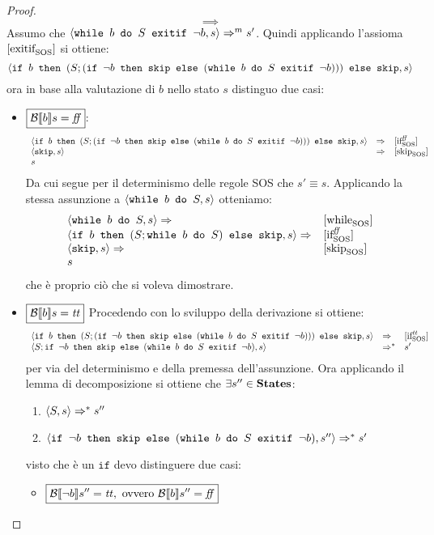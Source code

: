 \begin{enumerate}
\begin{proof}
$$
\boxed{\implies}
$$
Assumo che $\confSs{\wbSE{b}{S}{\neg b}}{s} \Rar{m} s'$.
Quindi applicando l'assioma $\exitifSOS$ si ottiene:
$$
\confSs{\ifABC{b}{(S; (\ifABC{\neg b}{\skipForFriends}{(\wbSE{b}{S}{\neg b})}))}{\skipForFriends}}{s}
$$
ora in base alla valutazione di $b$ nello stato $s$ distinguo due casi:
\begin{itemize}
	\item $\boxed{\B{b} = \semfalse}$:
	$$
	\begin{array}{lll}
	\confSs{\ifABC{b}{(S; (\ifABC{\neg b}{\skipForFriends}{(\wbSE{b}{S}{\neg b})}))}{\skipForFriends}}{s} & \Rar{} & \ifffSOS \\
	\confSs{\skipForFriends}{s} & \Rar{}& \skipSOS \\
	s
	\end{array}
	$$
	Da cui segue per il determinismo delle regole SOS che $s' \equiv s$.
	Applicando la stessa assunzione a $\confSs{\wbS{b}{S}}{s}$ otteniamo:
	$$
	\begin{array}{ll}
	\confSs{\wbS{b}{S}}{s} \Rar{}& \whileSOS \\
	\confSs{\ifABC{b}{(S; \wbS{b}{S})}{\skipForFriends}}{s} \Rar{} & \ifffSOS \\ 
	\confSs{\skipForFriends}{s} \Rar{}& \skipSOS \\
	s
	\end{array}
	$$
	che è proprio ciò che si voleva dimostrare.
	\item $\boxed{\B{b} = \semtrue}$
	Procedendo con lo sviluppo della derivazione si ottiene:
	$$
	\begin{array}{lll}
	\confSs{\ifABC{b}{(S; (\ifABC{\neg b}{\skipForFriends}{(\wbSE{b}{S}{\neg b})}))}{\skipForFriends}}{s} & \Rar{} & \ifttSOS \\
	\confSs{S; \ifABC{\neg b}{\skipForFriends}{(\wbSE{b}{S}{\neg b})}}{s} & \Rar{*} & s'\\
	\end{array}
	$$
	per via del determinismo e della premessa dell'assunzione.
	Ora applicando il lemma di decomposizione si ottiene che
  $\exists s''\in\states$:
	\begin{enumerate}
	\item $\confSs{S}{s} \Rar{*} s''$
	\label{hw6:Ssgoestos''}
	\item $\confSs{\ifABC{\neg b}{\skipForFriends}{(\wbSE{b}{S}{\neg b})}}{s''} \Rar{*} s'$
	\label{hw6:ifnegb}
	\end{enumerate}
	visto che è un $\texttt{if}$ devo distinguere due casi:
	\begin{itemize}
		\item $\boxed{\B{\neg b}'' = \semtrue, \text{ ovvero } \B{b}'' = \semfalse}$

\end{itemize}
\end{itemize}
\end{proof}
\end{enumerate}
